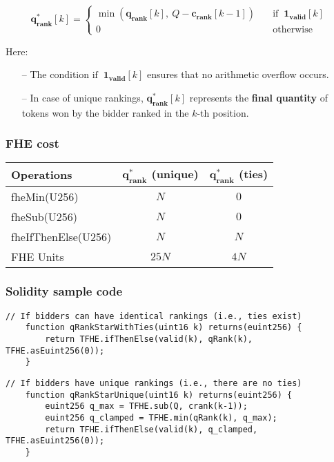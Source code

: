 \begin{equation*}
    \mathbf{q_{rank}^{*}}[k] = 
    \begin{cases}
        \min(\mathbf{q_{rank}}[k], \ Q - \mathbf{c_{rank}}[k-1]) \quad & \text{if } \ \mathbf{1_{valid}}[k] \\
        0 \quad & \text{otherwise }
    \end{cases}
\end{equation*}

Here:
\begin{itemize}
    \setlength\itemsep{0em}
    \item[--]The condition $\text{if } \ \mathbf{1_{valid}}[k]$ ensures that no arithmetic overflow occurs.
    \item[--]In case of unique rankings, $\mathbf{q_{rank}^{*}}[k]$ represents the \textbf{final quantity} of tokens won by the bidder ranked in the $k$-th position. 
\end{itemize}

\subsubsection{FHE cost}

\renewcommand{\arraystretch}{1.5}
\begin{tabular}{ |l|c|c| }
    \hline    
    Operations & $\mathbf{q_{rank}^{*}}$ (unique) & $\mathbf{q_{rank}^{*}}$ (ties) \\ 
    \hline
    fheMin(U256)         & $N$ & $0$  \\
    fheSub(U256)         & $N$ & $0$  \\
    fheIfThenElse(U256)  & $N$ & $N$  \\
    \hline
    \hline
    FHE Units            & $25N$ & $4N$ \\
    \hline
\end{tabular}

\subsubsection{Solidity sample code}

\begin{lstlisting}[language=Solidity]
    // If bidders can have identical rankings (i.e., ties exist)
    function qRankStarWithTies(uint16 k) returns(euint256) {
        return TFHE.ifThenElse(valid(k), qRank(k), TFHE.asEuint256(0));
    }
\end{lstlisting}

\begin{lstlisting}[language=Solidity]
    // If bidders have unique rankings (i.e., there are no ties)
    function qRankStarUnique(uint16 k) returns(euint256) {
        euint256 q_max = TFHE.sub(Q, crank(k-1));
        euint256 q_clamped = TFHE.min(qRank(k), q_max);
        return TFHE.ifThenElse(valid(k), q_clamped, TFHE.asEuint256(0));
    }    
\end{lstlisting}

